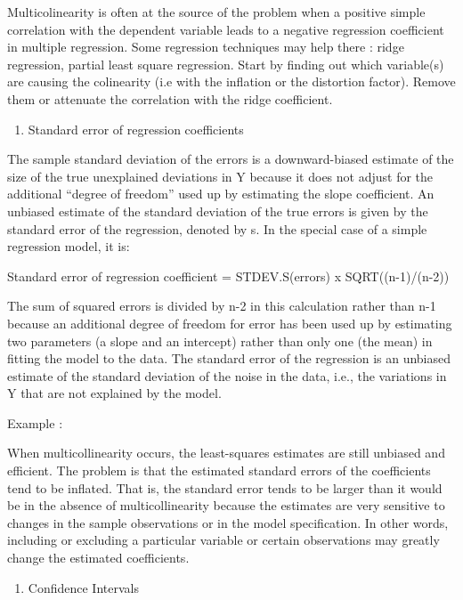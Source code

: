 \documentclass[]{article}
\providecommand{\tightlist}{%
  \setlength{\itemsep}{0pt}\setlength{\parskip}{0pt}}
\begin{document}
Multicolinearity is often at the source of the problem when a positive
simple correlation with the dependent variable leads to a negative
regression coefficient in multiple regression. Some regression
techniques may help there : ridge regression, partial least square
regression. Start by finding out which variable(s) are causing the
colinearity (i.e with the inflation or the distortion factor). Remove
them or attenuate the correlation with the ridge coefficient.

\begin{enumerate}
\def\labelenumi{(\roman{enumi})}
\setcounter{enumi}{1}
\tightlist
\item
  Standard error of regression coefficients
\end{enumerate}

The sample standard deviation of the errors is a downward-biased
estimate of the size of the true unexplained deviations in Y because it
does not adjust for the additional ``degree of freedom'' used up by
estimating the slope coefficient. An unbiased estimate of the standard
deviation of the true errors is given by the standard error of the
regression, denoted by s. In the special case of a simple regression
model, it is:

Standard error of regression coefficient = STDEV.S(errors) x
SQRT((n-1)/(n-2))

The sum of squared errors is divided by n-2 in this calculation rather
than n-1 because an additional degree of freedom for error has been used
up by estimating two parameters (a slope and an intercept) rather than
only one (the mean) in fitting the model to the data. The standard error
of the regression is an unbiased estimate of the standard deviation of
the noise in the data, i.e., the variations in Y that are not explained
by the model.

Example :

When multicollinearity occurs, the least-squares estimates are still
unbiased and efficient. The problem is that the estimated standard
errors of the coefficients tend to be inflated. That is, the standard
error tends to be larger than it would be in the absence of
multicollinearity because the estimates are very sensitive to changes in
the sample observations or in the model specification. In other words,
including or excluding a particular variable or certain observations may
greatly change the estimated coefficients.

\begin{enumerate}
\def\labelenumi{(\roman{enumi})}
\setcounter{enumi}{2}
\tightlist
\item
  Confidence Intervals
\end{enumerate}
\end{document}
